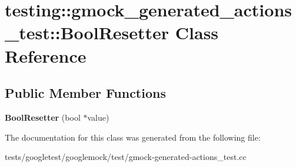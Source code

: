 \hypertarget{classtesting_1_1gmock__generated__actions__test_1_1BoolResetter}{}\section{testing\+:\+:gmock\+\_\+generated\+\_\+actions\+\_\+test\+:\+:Bool\+Resetter Class Reference}
\label{classtesting_1_1gmock__generated__actions__test_1_1BoolResetter}
\subsection*{Public Member Functions}
\begin{DoxyCompactItemize}
\item 
\mbox{\label{classtesting_1_1gmock__generated__actions__test_1_1BoolResetter_a55776cb9ef3b358e48898bb0257646ea}} 
{\bfseries Bool\+Resetter} (bool $\ast$value)
\end{DoxyCompactItemize}


The documentation for this class was generated from the following file\+:\begin{DoxyCompactItemize}
\item 
tests/googletest/googlemock/test/gmock-\/generated-\/actions\+\_\+test.\+cc\end{DoxyCompactItemize}
